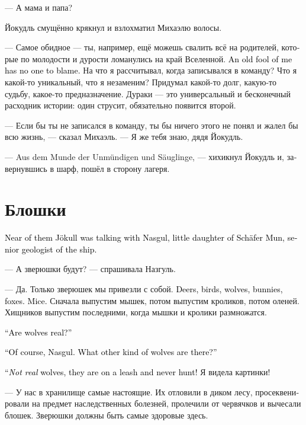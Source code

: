 \documentclass[a4paper,12pt,fleqn]{book}\usepackage{cooltooltips}\usepackage{polyglossia}\setdefaultlanguage[babelshorthands=true]{russian}\setotherlanguage{english}\defaultfontfeatures{Ligatures=TeX,Mapping=tex-text} \usepackage{xcolor}\definecolor{lightgray}{HTML}{bbbbbb}\color{lightgray}\newcommand{\ml}[3]{\textenglish{\textcolor{black}{#3}}}
\begin{document}
--- А мама и папа?

Йокудль смущённо крякнул и взлохматил Михаэлю волосы.

--- Самое обидное --- ты, например, ещё можешь свалить всё на родителей, которые по молодости и дурости ломанулись на край Вселенной.
\ml{$0$}
{А мне, старому дураку, даже и винить некого.}
{An old fool of me has no one to blame.}
На что я рассчитывал, когда записывался в команду?
Что я какой-то уникальный, что я незаменим?
Придумал какой-то долг, какую-то судьбу, какое-то предназначение.
Дураки --- это универсальный и бесконечный расходник истории: один струсит, обязательно появится второй.

--- Если бы ты не записался в команду, ты бы ничего этого не понял и жалел бы всю жизнь, --- сказал Михаэль.
--- Я же тебя знаю, дядя Йокудль.

--- Aus dem Munde der Unmündigen und Säuglinge, --- хихикнул Йокудль и, завернувшись в шарф, пошёл в сторону лагеря.

\section{Блошки}

\ml{$0$}
{Неподалёку Йокудль разговаривал с Назгуль, маленькой дочкой Шефера Муна --- старшего геолога корабля.}
{Near of them Jökull was talking with Nasgul, little daughter of Schäfer Mun, senior geologist of the ship.}

--- А зверюшки будут? --- спрашивала Назгуль.

--- Да.
Только зверюшек мы привезли с собой.
\ml{$0$}
{Олени, птички, волки, кролики, лисы.}
{Deers, birds, wolves, bunnies, foxes.}
\ml{$0$}
{Мышки.}
{Mice.}
Сначала выпустим мышек, потом выпустим кроликов, потом оленей.
Хищников выпустим последними, когда мышки и кролики размножатся.

\ml{$0$}
{--- А волки настоящие?}
{``Are wolves real?''}

\ml{$0$}
{--- Конечно, Назгуль.}
{``Of course, Nasgul.}
\ml{$0$}
{А какие ещё бывают волки?}
{What other kind of wolves are there?''}

\ml{$0$}
{--- Бывают ненастоящие, которые на поводке сидят и не охотятся!}
{``\emph{Not real} wolves, they are on a leash and never hunt!}
Я видела картинки!

--- У нас в хранилище самые настоящие.
Их отловили в диком лесу, просеквенировали на предмет наследственных болезней, пролечили от червячков и вычесали блошек.
Зверюшки должны быть самые здоровые здесь.
\end{document}
